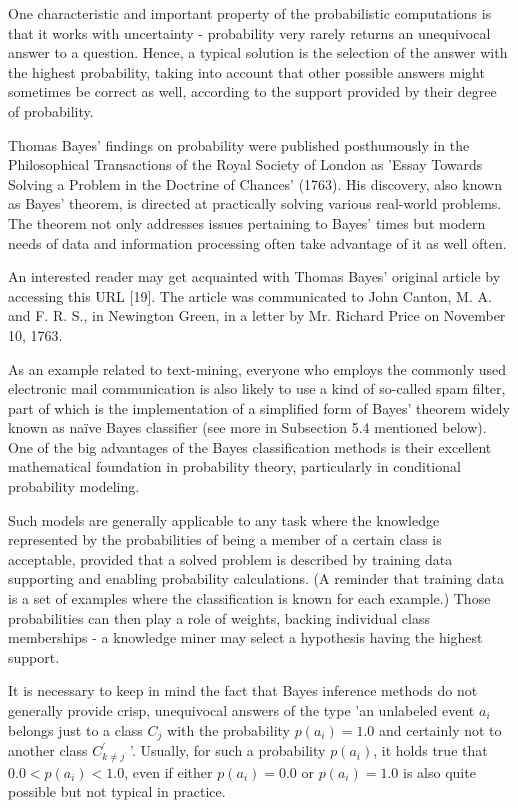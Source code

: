 \documentclass[10pt]{book}
\begin{document}
One characteristic and important property of the probabilistic computations is that it works with uncertainty - probability very rarely returns an unequivocal answer to a question. Hence, a typical solution is the selection of the answer with the highest probability, taking into account that other possible answers might sometimes be correct as well, according to the support provided by their degree of probability.

Thomas Bayes' findings on probability were published posthumously in the Philosophical Transactions of the Royal Society of London as 'Essay Towards Solving a Problem in the Doctrine of Chances' (1763). His discovery, also known as Bayes' theorem, is directed at practically solving various real-world problems. The theorem not only addresses issues pertaining to Bayes' times but modern needs of data and information processing often take advantage of it as well often.

An interested reader may get acquainted with Thomas Bayes' original article by accessing this URL [19]. The article was communicated to John Canton, M. A. and F. R. S., in Newington Green, in a letter by Mr. Richard Price on November 10, 1763.

As an example related to text-mining, everyone who employs the commonly used electronic mail communication is also likely to use a kind of so-called spam filter, part of which is the implementation of a simplified form of Bayes' theorem widely known as naïve Bayes classifier (see more in Subsection 5.4 mentioned below). One of the big advantages of the Bayes classification methods is their excellent mathematical foundation in probability theory, particularly in conditional probability modeling.

Such models are generally applicable to any task where the knowledge represented by the probabilities of being a member of a certain class is acceptable, provided that a solved problem is described by training data supporting and enabling probability calculations. (A reminder that training data is a set of examples where the classification is known for each example.) Those probabilities can then play a role of weights, backing individual class memberships - a knowledge miner may select a hypothesis having the highest support.

It is necessary to keep in mind the fact that Bayes inference methods do not generally provide crisp, unequivocal answers of the type 'an unlabeled event $a_{i}$ belongs just to a class $C_{j}$ with the probability $p\left(a_{i}\right)=1.0$ and certainly not to another class $C_{k \neq j}^{\prime}$ '. Usually, for such a probability $p\left(a_{i}\right)$, it holds true that $0.0<p\left(a_{i}\right)<1.0$, even if either $p\left(a_{i}\right)=0.0$ or $p\left(a_{i}\right)=1.0$ is also quite possible but not typical in practice.
\end{document}
